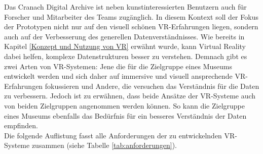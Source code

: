 \documentclass[a4paper,12pt,oneside]{article}
\begin{document}
      Das Cranach Digital Archive ist neben kunstinteressierten Benutzern auch für
      Forscher und Mitarbeiter des Teams zugänglich. In diesem Kontext soll der
      Fokus der Prototypen nicht nur auf den visuell schönen VR-Erfahrungen liegen,
      sondern auch auf der Verbesserung des generellen Datenverständnisses.
      Wie bereits in Kapitel \ref{Konzept und Nutzung von VR}
      erwähnt wurde, kann Virtual Reality dabei helfen, komplexe Datenstrukturen besser
      zu verstehen. Demnach gibt es zwei Arten von VR-Systemen: Jene die für die 
      Zielgruppe eines Museums entwickelt werden und sich daher auf immersive 
      und visuell ansprechende VR-Erfahrungen fokussieren 
      und Andere, die versuchen das Verständnis für die Daten zu verbessern. 
      Jedoch ist zu erwähnen, dass beide Ansätze der VR-Systeme auch von
      beiden Zielgruppen angenommen werden können. So kann die Zielgruppe eines Museums 
      ebenfalls das Bedürfnis für ein besseres Verständnis der Daten empfinden.\\
      Die folgende Auflistung fasst alle Anforderungen der zu entwickelnden 
      VR-Systeme zusammen (siehe Tabelle \ref{tab:anforderungen}).\\
\end{document}
